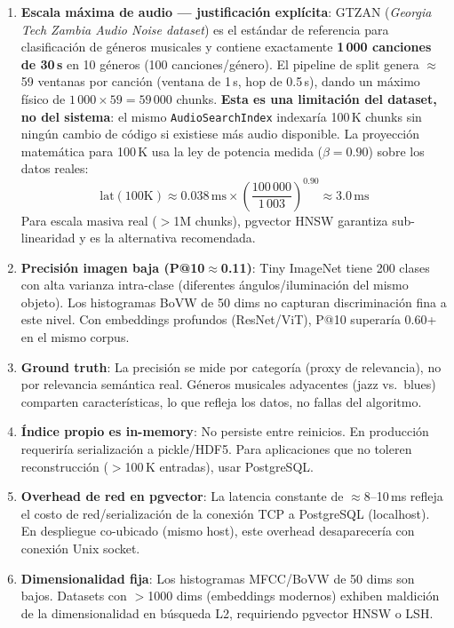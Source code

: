 \documentclass[12pt,a4paper]{article}
\begin{document}
\begin{enumerate}[leftmargin=*, label=\arabic*.]
  \item \textbf{Escala máxima de audio --- justificación explícita}:
        GTZAN (\emph{Georgia Tech Zambia Audio Noise dataset}) es el estándar
        de referencia para clasificación de géneros musicales y contiene
        exactamente \textbf{1\,000 canciones de 30\,s} en 10 géneros
        (100 canciones/género). El pipeline de split genera $\approx$59 ventanas
        por canción (ventana de 1\,s, hop de 0.5\,s), dando un máximo físico de
        $1\,000 \times 59 = 59\,000$ chunks.
        \textbf{Esta es una limitación del dataset, no del sistema}: el mismo
        \texttt{AudioSearchIndex} indexaría 100\,K chunks sin ningún cambio de
        código si existiese más audio disponible.
        La proyección matemática para 100\,K usa la ley de potencia medida
        ($\beta = 0.90$) sobre los datos reales:
        \[
          \text{lat}(100\text{K}) \approx 0.038\,\text{ms} \times
          \left(\frac{100\,000}{1\,003}\right)^{0.90} \approx 3.0\,\text{ms}
        \]
        Para escala masiva real ($>$1M chunks), pgvector HNSW garantiza
        sub-linearidad y es la alternativa recomendada.

  \item \textbf{Precisión imagen baja (P@10$\approx$0.11)}: Tiny ImageNet tiene 200 clases
        con alta varianza intra-clase (diferentes ángulos/iluminación del mismo objeto).
        Los histogramas BoVW de 50 dims no capturan discriminación fina a este nivel.
        Con embeddings profundos (ResNet/ViT), P@10 superaría 0.60+ en el mismo corpus.

  \item \textbf{Ground truth}: La precisión se mide por categoría (proxy de relevancia),
        no por relevancia semántica real. Géneros musicales adyacentes (jazz vs.\ blues)
        comparten características, lo que refleja los datos, no fallas del algoritmo.

  \item \textbf{Índice propio es in-memory}: No persiste entre reinicios.
        En producción requeriría serialización a pickle/HDF5.
        Para aplicaciones que no toleren reconstrucción ($>$100\,K entradas), usar PostgreSQL.

  \item \textbf{Overhead de red en pgvector}: La latencia constante de $\approx$8--10\,ms
        refleja el costo de red/serialización de la conexión TCP a PostgreSQL (localhost).
        En despliegue co-ubicado (mismo host), este overhead desaparecería con conexión Unix socket.

  \item \textbf{Dimensionalidad fija}: Los histogramas MFCC/BoVW de 50 dims son bajos.
        Datasets con $>$1000 dims (embeddings modernos) exhiben maldición de la dimensionalidad
        en búsqueda L2, requiriendo pgvector HNSW o LSH.
\end{enumerate}
\end{document}
